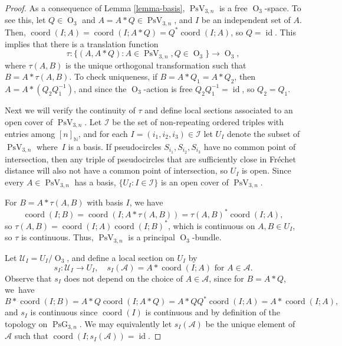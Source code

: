 \documentclass[JEP,XML,SOM,Unicode,NoFloatCountersInSection,published]{cedram}
\theoremstyle{remark}
\let\mc\mathcal
\let\mb\mathbb
\DeclareMathOperator{\pg}{PsG}
\DeclareMathOperator{\orth}{O}
\DeclareMathOperator{\pstief}{PsV}
\DeclareMathOperator{\coord}{coord}
\DeclareMathOperator{\id}{id}
\begin{document}
\begin{proof}
As a consequence of Lemma \ref{lemma-basis}, $\pstief_{3,n}$ is a free $\orth_3$-space. To see this, let $Q \in \orth_3$ and $A = A*Q \in \pstief_{3,n}$, and $I$ be an independent set of $A$. Then, $\coord(I;A) = \coord(I;A*Q) = Q^* \coord(I;A)$, so $Q = \id$.
This implies that there is a translation function
\[ \tau : \{(A,A*Q): A \in \pstief_{3,n}, Q \in \orth_3 \} \to \orth_3, \]
where $\tau(A,B)$ is the unique orthogonal transformation such that $B = A*\tau(A,B)$.
To check uniqueness, if $B = A*Q_1 = A*Q_2$, then $A = A*(Q_2 Q_1^{-1})$, and since the $\orth_3$-action is free $Q_2 Q_1^{-1} = \id$, so $Q_2=Q_1$.

Next we will verify the continuity of $\tau$ and define local sections associated to an open cover of $\pstief_{3,n}$.
Let $\mc{I}$ be the set of non-repeating ordered triples with entries among $[n]_\mb{N}$, and for each $I = (i_1,i_2,i_3) \in \mc{I}$ let $U_I$ denote the subset of $\pstief_{3,n}$ where~$I$ is a basis.
If pseudocircles $S_{i_1},S_{i_2},S_{i_3}$ have no common point of intersection, then any triple of pseudocircles that are sufficiently close in Fréchet distance will also not have a common point of intersection, so $U_I$ is open. Since every $A \in \pstief_{3,n}$ has a basis, $\{U_I : I \in \mc{I}\}$ is an open cover of $\pstief_{3,n}$.

For $B = A*\tau(A,B)$ with basis $I$, we have
\[
\coord(I;B) = \coord(I;A*\tau(A,B)) = \tau(A,B)^*\coord(I;A),
\]
so $\tau(A,B) = \coord(I;A)\coord(I;B)^*$, which is continuous on $A,B \in U_I$, so $\tau$ is continuous.
Thus, $\pstief_{3,n}$ is a principal $\orth_3$-bundle.

Let $\mc{U}_I = U_I/\orth_3$, and define a local section on $U_I$ by
\[ s_I : \mc{U}_I \to U_I, \quad s_I(\mc{A}) = A *\coord(I;A) \text{ for } A \in \mc{A}. \]
Observe that $s_I$ does not depend on the choice of $A \in \mc{A}$, since for $B = A*Q$, we~have
\[
B *\coord(I;B) = A*Q \coord(I;A*Q) = A*Q Q^* \coord(I;A) = A*\coord(I;A),
\]
and $s_I$ is continuous since $\coord(I)$ is continuous and by definition of the topology on $\pg_{3,n}$.
We may equivalently let $s_I(\mc{A})$ be the unique element of $\mc{A}$ such that $\coord(I;s_I(\mc{A})) = \id$.


\end{proof}
\end{document}
